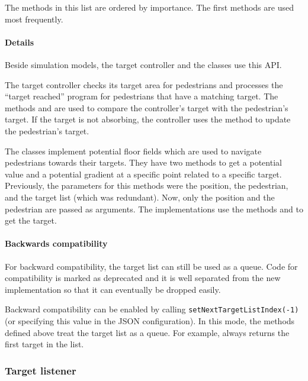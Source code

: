 The methods in this list are ordered by importance.
The first methods are used most frequently.

\paragraph{Details}

Beside simulation models, the target controller and the
 classes use this \acs{API}.

The target controller checks its target area for pedestrians and processes the
``target reached'' program for pedestrians that have a matching target.
The methods  and  are used to compare
the controller's target with the pedestrian's target.
If the target is not absorbing, the controller uses the method
 to update the pedestrian's target.

The  classes implement potential floor fields which
are used to navigate pedestrians towards their targets.
They have two methods to get a potential value and a potential gradient at a
specific point related to a specific target.
Previously, the parameters for this methods were the position, the pedestrian,
and the target list (which was redundant).
Now, only the position and the pedestrian are passed as arguments.
The implementations use the methods  and
 to get the target.

\paragraph{Backwards compatibility}

For backward compatibility, the target list can still be used as a queue.
Code for compatibility is marked as deprecated and it is well separated from the
new implementation so that it can eventually be dropped easily.

Backward compatibility can be enabled by calling
\verb|setNextTargetListIndex(-1)| (or specifying this value in the \acs{JSON}
configuration).
In this mode, the methods defined above treat the target list as a queue.
For example,  always returns the first target in the
list.

\subsubsection{Target listener}
\label{subsec:target-listener}


